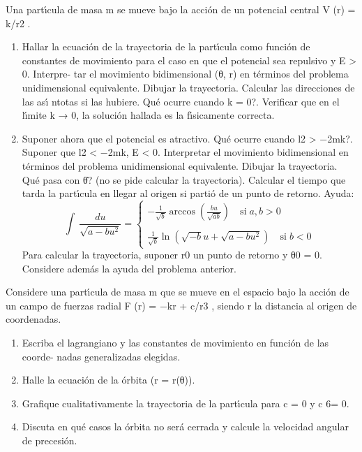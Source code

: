 \documentclass[10pt,oneside]{CBFT_book}
\begin{document}
\begin{ejercicios}
\label{ej4}
\item{ \bf }
Una partı́cula de masa m se mueve bajo la acción de un potencial central V (r) = k/r2 .
\begin{enumerate}[label=(\alph*)]
\item Hallar la ecuación de la trayectoria de la partı́cula como función de constantes
de movimiento para el caso en que el potencial sea repulsivo y E > 0. Interpre-
tar el movimiento bidimensional (θ, r) en términos del problema unidimensional
equivalente. Dibujar la trayectoria. Calcular las direcciones de las ası́ ntotas si
las hubiere. Qué ocurre cuando k = 0?. Verificar que en el lı́mite k → 0, la
solución hallada es la fı́sicamente correcta.
\item Suponer ahora que el potencial es atractivo. Qué ocurre cuando l2 > −2mk?.
Suponer que l2 < −2mk, E < 0. Interpretar el movimiento bidimensional en
términos del problema unidimensional equivalente. Dibujar la trayectoria. Qué
pasa con θ̇? (no se pide calcular la trayectoria). Calcular el tiempo que tarda la
partı́cula en llegar al origen si partió de un punto de retorno.
Ayuda:
\[
	\int \: \frac{du}{\sqrt{a - bu^2}} =
	\begin{cases}
		\displaystyle -\frac{1}{\sqrt{b}} \arccos\left( \frac{bu}{\sqrt{ab}} \right) \quad \mathrm{si }\; a,b>0		\\
		\\
		\displaystyle \frac{1}{\sqrt{b}} \ln( \sqrt{-b} u + \sqrt{a - bu^2} ) \quad \mathrm{si }\; b<0
	\end{cases}
\]
Para calcular la trayectoria, suponer r0 un punto de retorno y θ0 = 0. Considere
además la ayuda del problema anterior.
\end{enumerate}

\label{ej5}
\item{ \bf }
Considere una partı́cula de masa m que se mueve en el espacio bajo la acción de
un campo de fuerzas radial F (r) = −kr + c/r3 , siendo r la distancia al origen de
coordenadas.
\begin{enumerate}[label=(\alph*)]
\item Escriba el lagrangiano y las constantes de movimiento en función de las coorde-
nadas generalizadas elegidas.
\item Halle la ecuación de la órbita (r = r(θ)).
\item Grafique cualitativamente la trayectoria de la partı́cula para c = 0 y c 6= 0.
\item Discuta en qué casos la órbita no será cerrada y calcule la velocidad angular de
precesión.
\end{enumerate}

\end{ejercicios}
\end{document}
